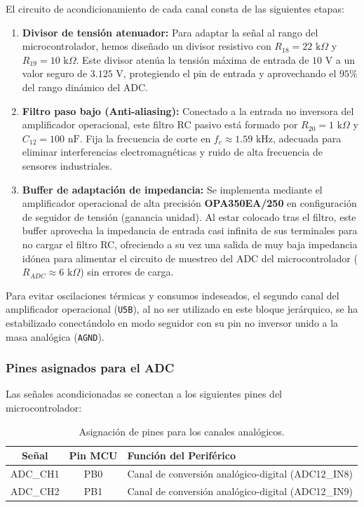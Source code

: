 \documentclass[12pt,a4paper]{article}
\begin{document}
El circuito de acondicionamiento de cada canal consta de las siguientes etapas:
\begin{enumerate}
    \item \textbf{Divisor de tensión atenuador:} Para adaptar la señal al rango del microcontrolador, hemos diseñado un divisor resistivo con $R_{18} = 22\text{ k}\Omega$ y $R_{19} = 10\text{ k}\Omega$. Este divisor atenúa la tensión máxima de entrada de $10\text{ V}$ a un valor seguro de $3.125\text{ V}$, protegiendo el pin de entrada y aprovechando el $95\%$ del rango dinámico del ADC.
    \item \textbf{Filtro paso bajo (Anti-aliasing):} Conectado a la entrada no inversora del amplificador operacional, este filtro RC pasivo está formado por $R_{20} = 1\text{ k}\Omega$ y $C_{12} = 100\text{ nF}$. Fija la frecuencia de corte en $f_c \approx 1.59\text{ kHz}$, adecuada para eliminar interferencias electromagnéticas y ruido de alta frecuencia de sensores industriales.
    \item \textbf{Buffer de adaptación de impedancia:} Se implementa mediante el amplificador operacional de alta precisión \textbf{OPA350EA/250} en configuración de seguidor de tensión (ganancia unidad). Al estar colocado tras el filtro, este buffer aprovecha la impedancia de entrada casi infinita de sus terminales para no cargar el filtro RC, ofreciendo a su vez una salida de muy baja impedancia idónea para alimentar el circuito de muestreo del ADC del microcontrolador ($R_{ADC} \approx 6\text{ k}\Omega$) sin errores de carga.
\end{enumerate}

Para evitar oscilaciones térmicas y consumos indeseados, el segundo canal del amplificador operacional (\texttt{U5B}), al no ser utilizado en este bloque jerárquico, se ha estabilizado conectándolo en modo seguidor con su pin no inversor unido a la masa analógica (\texttt{AGND}).

\subsubsection{Pines asignados para el ADC}

Las señales acondicionadas se conectan a los siguientes pines del microcontrolador:

\begin{table}[H]
\centering
\begin{tabular}{|c|c|l|}
\hline
\textbf{Señal} & \textbf{Pin MCU} & \textbf{Función del Periférico} \\ \hline
ADC\_CH1 & PB0 & Canal de conversión analógico-digital (ADC12\_IN8) \\ \hline
ADC\_CH2 & PB1 & Canal de conversión analógico-digital (ADC12\_IN9) \\ \hline
\end{tabular}
\caption{Asignación de pines para los canales analógicos.}
\label{tab:adc_pines}
\end{table}
\end{document}
